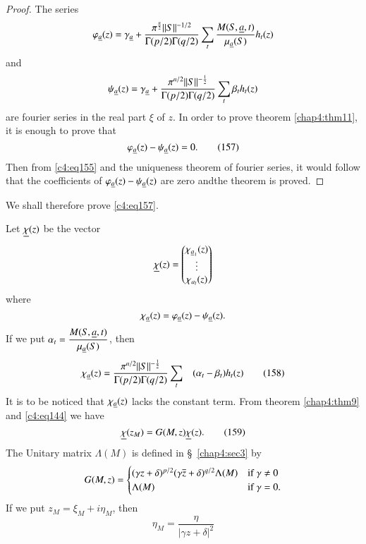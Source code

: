 \begin{proof}
The series
$$
\varphi_{\underline{a}}(z)=\gamma_{\underline{a}}+\frac{\pi^{\frac{n}{2}}||S||^{-1/2}}{\Gamma(p/2)\Gamma(q/2)}\sum_{t}\frac{M(S,\underline{a},t)}{\mu_{\underline{a}}(S)}h_{t}(z) 
$$
and 
$$
\psi_{\underline{a}}(z)=\gamma_{\underline{a}}+\frac{\pi^{n/2}||S||^{-\frac{1}{2}}}{\Gamma(p/2)\Gamma(q/2)}\sum_{t}\beta_{t}h_{t}(z)
$$
are fourier series in the real part $\xi$ of $z$. In order to prove
theorem \ref{chap4:thm11}, it is enough to prove that
\begin{equation*}
\varphi_{\underline{a}}(z)-\psi_{\underline{a}}(z)=0.\tag{157}\label{c4:eq157}
\end{equation*}
Then from \eqref{c4:eq155} and the uniqueness theorem of fourier series, it
would follow that the coefficients of
$\varphi_{\underline{a}}(z)-\psi_{\underline{a}}(z)$ are zero and\pageoriginale the
theorem is proved.
\end{proof}

We shall therefore prove \eqref{c4:eq157}.

Let $\underline{\chi}(z)$ be the vector
$$
\underline{\chi}(z)=
\begin{pmatrix}
\chi_{\underline{a}_{1}} (z)\\
\vdots\\
\chi_{a_{l}}(z)
\end{pmatrix}
$$
where 
$$
\chi_{\underline{a}}(z)=\varphi_{\underline{a}}(z)-\psi_{\underline{a}}(z).
$$
If we put $\alpha_{t}=\dfrac{M(S,\underline{a},t)}{\mu_{\underline{a}}(S)}$, then
\begin{equation*}
\chi_{\underline{a}}(z)=\frac{\pi^{n/2}||S||^{-\frac{1}{2}}}{\Gamma(p/2)\Gamma(q/2)}\sum_{t}\quad
(\alpha_{t}-\beta_{t})h_{t}(z)\tag{158}\label{c4:eq158} 
\end{equation*}
It is to be noticed that $\chi_{\underline{a}}(z)$ lacks the constant
term. From theorem \ref{chap4:thm9} and \eqref{c4:eq144} we have
\begin{equation*}
\underline{\chi}(z_{M})=G(M,z)\underline{\chi}(z).\tag{159}\label{c4:eq159}
\end{equation*}
The Unitary matrix $\Lambda(M)$ is defined in \S\ \ref{chap4:sec3} by 
$$
G(M,z)=
\begin{cases}
(\gamma z+\delta)^{p/2}(\gamma\overline{z}+\delta)^{q/2}\Lambda(M) &\text{if
  } \gamma\neq 0\\
\Lambda(M) & \text{if } \gamma=0.
\end{cases}
$$
If we put $z_{M}=\xi_{M}+i\eta_{M}$, then
\begin{equation*}
\eta_{M}=\frac{\eta}{|\gamma z+\delta|^{2}}\tag{160}\label{c4:eq160}
\end{equation*}

